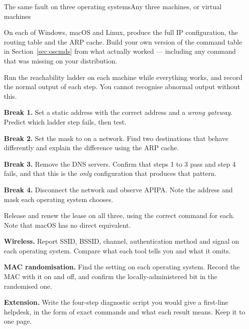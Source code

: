 \begin{lab}{The same fault on three operating systems}{Any three machines, or virtual machines}
\begin{tasks}
  \item On each of Windows, macOS and Linux, produce the full IP configuration,
        the routing table and the ARP cache. Build your own version of the
        command table in Section~\ref{sec:oscmds} from what actually worked --- including any
        command that was missing on your distribution.
  \item Run the reachability ladder on each machine while everything works, and
        record the normal output of each step. You cannot recognise abnormal
        output without this.
  \item \textbf{Break 1.} Set a static address with the correct address and a
        \emph{wrong gateway}. Predict which ladder step fails, then test.
  \item \textbf{Break 2.} Set the mask to  on a  network. Find
        two destinations that behave differently and explain the difference using
        the ARP cache.
  \item \textbf{Break 3.} Remove the DNS servers. Confirm that steps 1 to 3 pass
        and step 4 fails, and that this is the \emph{only} configuration that
        produces that pattern.
  \item \textbf{Break 4.} Disconnect the network and observe APIPA. Note the
        address and mask each operating system chooses.
  \item Release and renew the lease on all three, using the correct command for
        each. Note that macOS has no direct equivalent.
  \item \textbf{Wireless.} Report SSID, BSSID, channel, authentication method and
        signal on each operating system. Compare what each tool tells you and
        what it omits.
  \item \textbf{MAC randomisation.} Find the setting on each operating system.
        Record the MAC with it on and off, and confirm the locally-administered
        bit in the randomised one.
  \item \textbf{Extension.} Write the four-step diagnostic script you would give
        a first-line helpdesk, in the form of exact commands and what each result
        means. Keep it to one page.
\end{tasks}
\end{lab}

